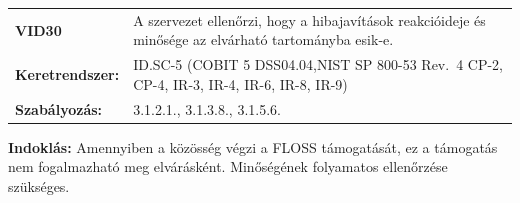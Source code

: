 \documentclass[12pt,magyar,a4paper,oneside]{scrreprt}
\begin{document}
\begin{longtable}[]{@{}ll@{}}
\toprule
\endhead
\begin{minipage}[t]{0.16\columnwidth}\raggedright
\textbf{VID30}\strut
\end{minipage} & \begin{minipage}[t]{0.79\columnwidth}\raggedright
A szervezet ellenőrzi, hogy a hibajavítások reakcióideje és minősége az
elvárható tartományba esik-e.\strut
\end{minipage}\tabularnewline
\begin{minipage}[t]{0.16\columnwidth}\raggedright
\textbf{Keretrendszer:}\strut
\end{minipage} & \begin{minipage}[t]{0.79\columnwidth}\raggedright
ID.SC-5 (COBIT 5 DSS04.04,NIST SP 800-53 Rev.~4 CP-2, CP-4, IR-3, IR-4,
IR-6, IR-8, IR-9)\strut
\end{minipage}\tabularnewline
\begin{minipage}[t]{0.16\columnwidth}\raggedright
\textbf{Szabályozás:}\strut
\end{minipage} & \begin{minipage}[t]{0.79\columnwidth}\raggedright
3.1.2.1., 3.1.3.8., 3.1.5.6.\strut
\end{minipage}\tabularnewline
\bottomrule
\end{longtable}

\textbf{Indoklás: } Amennyiben a közösség végzi a FLOSS támogatását, ez
a támogatás nem fogalmazható meg elvárásként. Minőségének folyamatos
ellenőrzése szükséges.
\end{document}
